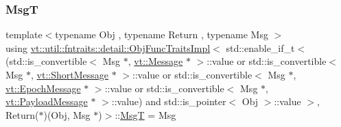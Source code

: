 \subsubsection{\texorpdfstring{MsgT}{MsgT}}
{\footnotesize\ttfamily template$<$typename Obj , typename Return , typename Msg $>$ \\
using \hyperlink{structvt_1_1util_1_1fntraits_1_1detail_1_1_obj_func_traits_impl}{vt\+::util\+::fntraits\+::detail\+::\+Obj\+Func\+Traits\+Impl}$<$ std\+::enable\+\_\+if\+\_\+t$<$(std\+::is\+\_\+convertible$<$ Msg $\ast$, \hyperlink{namespacevt_a3a3ddfef40b4c90915fa43cdd5f129ea}{vt\+::\+Message} $\ast$ $>$\+::value or std\+::is\+\_\+convertible$<$ Msg $\ast$, \hyperlink{namespacevt_a1125ac1da6c0bbf141e0ea0739d7602d}{vt\+::\+Short\+Message} $\ast$ $>$\+::value or std\+::is\+\_\+convertible$<$ Msg $\ast$, \hyperlink{namespacevt_ad67368ffae52d7325002586b41bb150e}{vt\+::\+Epoch\+Message} $\ast$ $>$\+::value or std\+::is\+\_\+convertible$<$ Msg $\ast$, \hyperlink{namespacevt_a89a92229c5622b855c02c549f83a1a68}{vt\+::\+Payload\+Message} $\ast$ $>$\+::value) and std\+::is\+\_\+pointer$<$ Obj $>$\+::value $>$, Return($\ast$)(Obj, Msg $\ast$)$>$\+::\hyperlink{structvt_1_1util_1_1fntraits_1_1detail_1_1_obj_func_traits_impl_3_01std_1_1enable__if__t_3_07std893b55e280057f64eb5acd3df924485e_a07b53799e22d96567eb141e3eeafb094}{MsgT} =  Msg}

